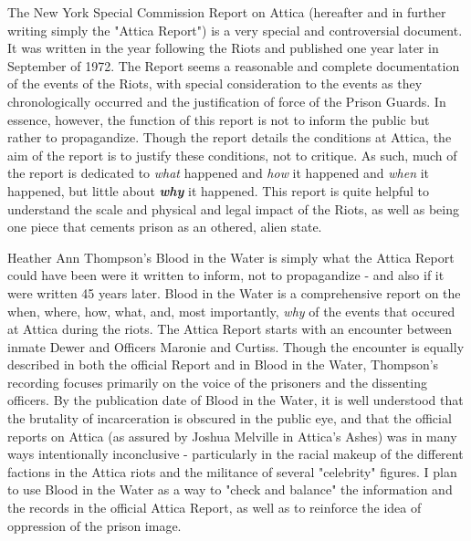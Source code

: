 


\begin{adjustwidth}{2.5ex}{0pt}

  The New York Special Commission Report on Attica (hereafter and in 
  further writing simply the "Attica Report") is a very special and 
  controversial document. It was written in the year following the 
  Riots and published one year later in September of 1972. The Report 
  seems a reasonable and complete documentation of the events of the 
  Riots, with special consideration to the events as they chronologically 
  occurred and the justification of force of the Prison Guards. In 
  essence, however, the function of this report is not to inform the 
  public but rather to propagandize. Though the report details 
  the conditions at Attica, the aim of the report is to justify these 
  conditions, not to critique. As such, much of the report is dedicated 
  to \textit{what} happened and \textit{how} it happened and 
  \textit{when} it happened, but little about \textit{\textbf{why}} 
  it happened. This report is quite helpful to understand the scale 
  and physical and legal impact of the Riots, as well as being one 
  piece that cements prison as an othered, alien state. 

\end{adjustwidth}


\clearpage



\begin{adjustwidth}{2.5ex}{0pt}

  Heather Ann Thompson's Blood in the Water is simply what the 
  Attica Report could have been were it written to inform, not to 
  propagandize - and also if it were written 45 years later. Blood 
  in the Water is a comprehensive report on the when, where, how, what, 
  and, most importantly, \textit{why} of the events that occured at 
  Attica during the riots. The Attica Report starts with an encounter 
  between inmate Dewer and Officers Maronie and Curtiss. Though 
  the encounter is equally described in both the official Report and 
  in Blood in the Water, Thompson's recording focuses primarily on 
  the voice of the prisoners and the dissenting officers. By the 
  publication date of Blood in the Water, it is well understood 
  that the brutality of incarceration is obscured in the public 
  eye, and that the official reports on Attica (as assured by 
  Joshua Melville in Attica's Ashes) was in many ways 
  intentionally inconclusive - particularly in the racial makeup of the 
  different factions in the Attica riots and the militance of several 
  "celebrity" figures. I plan to use Blood in the Water as a way to 
  "check and balance" the information and the records in the official 
  Attica Report, as well as to reinforce the idea of oppression of the 
  prison image. 

\end{adjustwidth}


